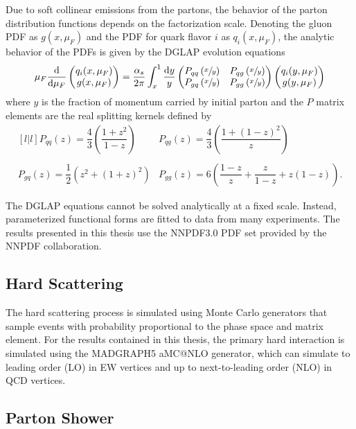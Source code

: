 Due to soft collinear emissions from the partons, the behavior of the parton distribution functions depends on the factorization scale.
Denoting the gluon PDF as $g(x, \mu_F)$ and the PDF for quark flavor $i$ as $q_i(x, \mu_F)$, the analytic behavior of the PDFs is given by the DGLAP evolution equations
\begin{equation}
  \mu_F \frac{\text{d}}{\text{d} \mu_F} \begin{pmatrix} q_i(x, \mu_F) \\ g(x, \mu_F) \end{pmatrix}
  = \frac{\alpha_s}{2\pi} \int_{x}^{1} \frac{\text{d}y}{y}
  \begin{pmatrix}
     P_{qq}\left(\sfrac{x}{y}\right) &  P_{qg}\left(\sfrac{x}{y}\right) \\
     P_{gq}\left(\sfrac{x}{y}\right) &  P_{gg}\left(\sfrac{x}{y}\right) 
  \end{pmatrix}
    \begin{pmatrix} q_i(y, \mu_F) \\ g(y, \mu_F) \end{pmatrix}
\end{equation}
where $y$ is the fraction of momentum carried by initial parton and the $P$ matrix elements are the real splitting kernels defined by
\begin{equation}
  \begin{matrix}[l | l]
    P_{qq}(z) = \dfrac{4}{3} \left( \dfrac{1+z^2}{1-z} \right)
    & P_{qg}(z) = \dfrac{4}{3} \left( \dfrac{1+(1-z)^2}{z} \right)
    \\ \\ P_{gq}(z) = \dfrac{1}{2} \left( z^2 + (1+z)^2 \right)
    & P_{gg}(z) = 6 \left( \dfrac{1-z}{z} + \dfrac{z}{1-z} + z(1-z) \right) .
  \end{matrix}
\end{equation}

The DGLAP equations cannot be solved analytically at a fixed scale.
Instead, parameterized functional forms are fitted to data from many experiments.  
The results presented in this thesis use the NNPDF3.0 PDF set provided by the NNPDF collaboration.

\subsection{Hard Scattering}


The hard scattering process is simulated using Monte Carlo generators that sample events with probability proportional to the phase space and matrix element.
For the results contained in this thesis, the primary hard interaction is simulated using the MADGRAPH5 aMC@NLO generator, which can simulate to leading order (LO) in EW vertices and up to next-to-leading order (NLO) in QCD vertices.

\subsection{Parton Shower}
